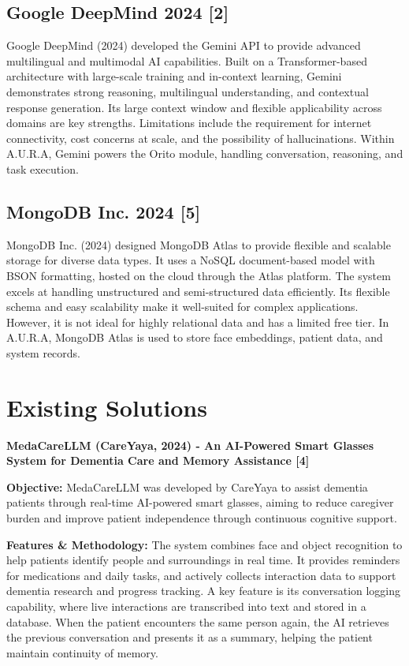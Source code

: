 \subsection{Google DeepMind 2024 [2]}
Google DeepMind (2024) developed the Gemini API to provide advanced multilingual and multimodal AI capabilities. Built on a Transformer-based architecture with large-scale training and in-context learning, Gemini demonstrates strong reasoning, multilingual understanding, and contextual response generation. Its large context window and flexible applicability across domains are key strengths. Limitations include the requirement for internet connectivity, cost concerns at scale, and the possibility of hallucinations. Within A.U.R.A, Gemini powers the Orito module, handling conversation, reasoning, and task execution.

\subsection{MongoDB Inc. 2024 [5]}
MongoDB Inc. (2024) designed MongoDB Atlas to provide flexible and scalable storage for diverse data types. It uses a NoSQL document-based model with BSON formatting, hosted on the cloud through the Atlas platform. The system excels at handling unstructured and semi-structured data efficiently. Its flexible schema and easy scalability make it well-suited for complex applications. However, it is not ideal for highly relational data and has a limited free tier. In A.U.R.A, MongoDB Atlas is used to store face embeddings, patient data, and system records.








\section{Existing Solutions}
\textbf{MedaCareLLM (CareYaya, 2024) - An AI-Powered Smart Glasses System for Dementia Care and Memory Assistance [4]}

\textbf{Objective:}
MedaCareLLM was developed by CareYaya to assist dementia patients through real-time AI-powered smart glasses, aiming to reduce caregiver burden and improve patient independence through continuous cognitive support.

\textbf{Features \& Methodology:}
The system combines face and object recognition to help patients identify people and surroundings in real time. It provides reminders for medications and daily tasks, and actively collects interaction data to support dementia research and progress tracking. A key feature is its conversation logging capability, where live interactions are transcribed into text and stored in a database. When the patient encounters the same person again, the AI retrieves the previous conversation and presents it as a summary, helping the patient maintain continuity of memory.


